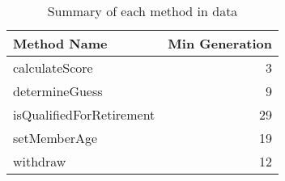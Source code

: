 \begin{table}[ht]
\centering
\begin{tabular}{lr}
  \hline
Method Name & Min Generation \\ 
  \hline
calculateScore &   3 \\ 
  determineGuess &   9 \\ 
  isQualifiedForRetirement &  29 \\ 
  setMemberAge &  19 \\ 
  withdraw &  12 \\ 
   \hline
\end{tabular}
\caption{Summary of each method in data} 
\label{table:each_method_summary 8}
\end{table}
